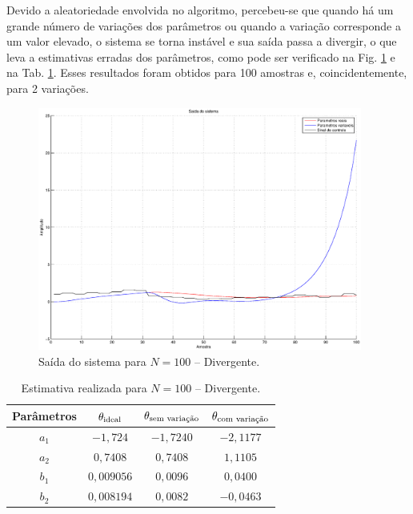 Devido a aleatoriedade envolvida no algoritmo, percebeu-se que quando há um
grande número de variações dos parâmetros ou quando a variação corresponde a um
valor elevado, o sistema se torna instável e sua saída passa a divergir, o que
leva a estimativas erradas dos parâmetros, como pode ser verificado na Fig.
\ref{fig:saida_sist_100_div} e na Tab. \ref{tab:estimativa_100_div}. Esses
resultados foram obtidos para 100 amostras e, coincidentemente, para 2
variações.

\begin{figure}[htb]
\centering
    \includegraphics[width=0.95\textwidth]{imgs/questao2/saida_100_div}
    \caption{Saída do sistema para $N = 100$ -- Divergente.}
    \label{fig:saida_sist_100_div}
\end{figure}

\begin{table}
\centering
    \caption{Estimativa realizada para $N = 100$ -- Divergente.}
    \label{tab:estimativa_100_div}
    \vspace{0.25cm}
    \begin{tabular}{|c|c|c|c|}
        \hline
        Parâmetros & 
        $\mathbf{\theta}_{\text{ideal}}$&
        $\mathbf{\theta}_{\text{sem variação}}$&
        $\mathbf{\theta}_{\text{com variação}}$\\
        \hline
        \hline
        $a_1$ & $-1,724$   & $-1,7240$ & $-2,1177$ \\
        \hline
        $a_2$ & $0,7408$   & $0,7408$  & $1,1105$ \\
        \hline
        $b_1$ & $0,009056$ & $0,0096$  & $0,0400$ \\
        \hline
        $b_2$ & $0,008194$ & $0,0082$  & $-0,0463$ \\
        \hline
    \end{tabular}
\end{table}

